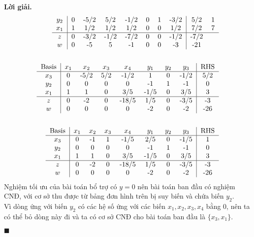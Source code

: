 \documentclass[12pt]{article}
\newenvironment{solution}{%
     \setlength\parindent{0pt}\par\medskip\textbf{Lời giải.}\quad}{%
     \hfill\tiny$\blacksquare$\par\medskip}
\begin{document}
\begin{solution}
\begin{align*}
\begin{tabular}{c|ccccccc|cc}
                $y_2$ & 0 & -5/2 & 5/2 & -1/2 & 0 & 1 & -3/2 & 5/2 & 1 \\
                $x_1$ & 1 & 1/2 & 1/2 & 1/2 & 0 & 0 & 1/2 & 7/2 & 7 \\ \hline
                $z$ & 0 & -3/2 & -1/2 & -7/2 & 0 & 0 & -1/2 & -7/2 \\
                $w$ & 0 & -5 & 5 & -1 & 0 & 0 & -3 & -21
            \end{tabular}
            \\
            \\
            \begin{tabular}{c|ccccccc|cc}
                \text{Basis} & $x_1$ & $x_2$ & $x_3$ & $x_4$ & $y_1$ & $y_2$ & $y_3$ & RHS \\ \hline
                $x_3$ & 0 & -5/2 & 5/2 & -1/2 & 1 & 0 & -1/2 & 5/2 \\
                $y_2$ & 0 & 0 & 0 & 0 & -1 & 1 & -1 & 0 \\
                $x_1$ & 1 & 1 & 0 & 3/5 & -1/5 & 0 & 3/5 & 3 \\ \hline
                $z$ & 0 & -2 & 0 & -18/5 & 1/5 & 0 & -3/5 & -3 \\
                $w$ & 0 & 0 & 0 & 0 & -2 & 0 & -2 & -26
            \end{tabular}
            \\
            \\
            \begin{tabular}{c|ccccccc|cc}
                \text{Basis} & $x_1$ & $x_2$ & $x_3$ & $x_4$ & $y_1$ & $y_2$ & $y_3$ & RHS \\ \hline
                $x_3$ & 0 & -1 & 1 & -1/5 & 2/5 & 0 & -1/5 & 1 \\
                $y_2$ & 0 & 0 & 0 & 0 & -1 & 1 & -1 & 0 \\
                $x_1$ & 1 & 1 & 0 & 3/5 & -1/5 & 0 & 3/5 & 3 \\ \hline
                $z$ & 0 & -2 & 0 & -18/5 & 1/5 & 0 & -3/5 & -3 \\
                $w$ & 0 & 0 & 0 & 0 & -2 & 0 & -2 & -26
            \end{tabular}
        \end{align*}
        Nghiệm tối ưu của bài toán bổ trợ có $y = 0$ nên bài toán ban đầu có nghiệm CNĐ, với cơ sở thu được từ bảng đơn hình trên bị suy biến và chứa biến $y_2$. 
        \\
        Vì dòng ứng với biến $y_2$ có các hệ số ứng với các biến $x_1, x_2, x_3, x_4$ bằng 0, nên ta có thể bỏ dòng này đi và ta có cơ sở CNĐ cho bài toán ban đầu là $\{x_3, x_1\}$.

\end{solution}
\end{document}
